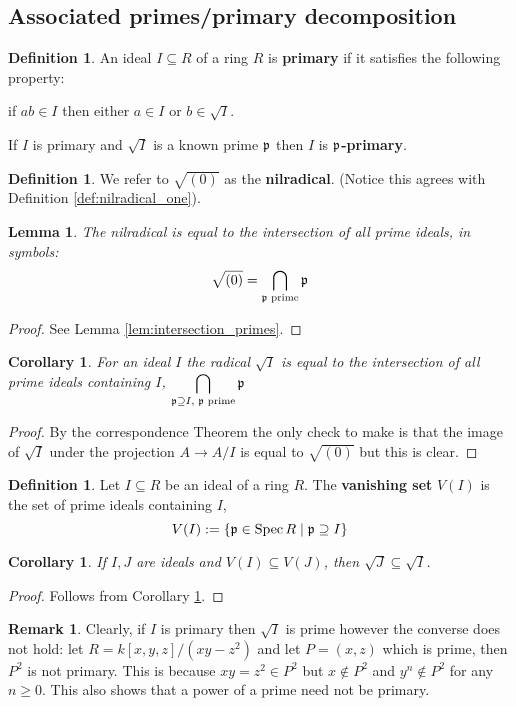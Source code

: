 \documentclass[12pt]{article}
\theoremstyle{plain}
\newtheorem{lemma}[thm]{Lemma}
\newtheorem{cor}[thm]{Corollary}
\theoremstyle{definition}
\newtheorem{defn}[thm]{Definition} %
\newtheorem{remark}[thm]{Remark}
\newcommand{\lto}{\longrightarrow}
\begin{document}
\subsection{Associated primes/primary decomposition}
\begin{defn}
\label{def:p-primary}
An ideal $I \subseteq R$ of a ring $R$ is \textbf{primary} if it satisfies the following property:

if $ab \in I$ then either $a \in I$ or $b \in \sqrt{I}$.

If $I$ is primary and $\sqrt{I}$ is a known prime $\frak{p}$ then $I$ is \textbf{$\frak{p}$-primary}.
\end{defn}
\begin{defn}
We refer to $\sqrt{(0)}$ as the \textbf{nilradical}. (Notice this agrees with Definition \ref{def:nilradical_one}).
\end{defn}
\begin{lemma}
The nilradical is equal to the intersection of all prime ideals, in symbols:
\[\sqrt{(0)} = \bigcap_{\frak{p}\text{ prime}}\frak{p}\]
\end{lemma}
\begin{proof}
See Lemma \ref{lem:intersection_primes}.
\end{proof}
\begin{cor}
\label{cor:intersection_primes}
For an ideal $I$ the radical $\sqrt{I}$ is equal to the intersection of all prime ideals containing $I$, $\displaystyle\bigcap_{\frak{p} \supseteq I\text{, }\frak{p}\text{ prime}}\frak{p}$
\end{cor}
\begin{proof}
By the correspondence Theorem the only check to make is that the image of $\sqrt{I}$ under the projection $A \lto A/I$ is equal to $\sqrt{(0)}$ but this is clear.
\end{proof}
\begin{defn}
\label{def:vanishing} Let $I \subseteq R$ be an ideal of a ring $R$. The \textbf{vanishing set} $V(I)$ is the set of prime ideals containing $I$,
\[V(I) := \lbrace \frak{p} \in \operatorname{Spec}R \mid \frak{p} \supseteq I\rbrace\]
\end{defn}
\begin{cor}
\label{cor:vanishing_subset}
If $I,J$ are ideals and $V(I) \subseteq V(J)$, then $\sqrt{J} \subseteq \sqrt{I}$.
\end{cor}
\begin{proof}
Follows from Corollary \ref{cor:intersection_primes}.
\end{proof}
\begin{remark}
\label{rem:radical_prime}
Clearly, if $I$ is primary then $\sqrt{I}$ is prime however the converse does not hold: let $R = k[x,y,z]/(xy - z^2)$ and let $P = (x,z)$ which is prime, then $P^2$ is not primary. This is because $xy = z^2 \in P^2$ but $x \not\in P^2$ and $y^n \not\in P^2$ for any $n \geq 0$. This also shows that a power of a prime need not be primary.
\end{remark}
\end{document}
